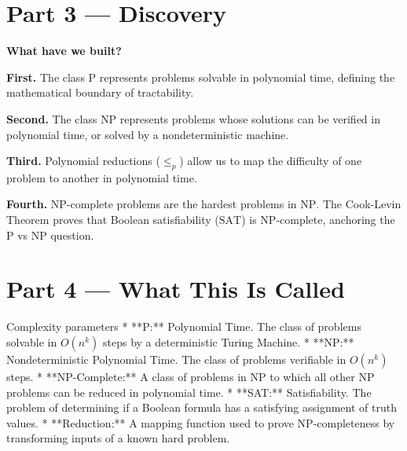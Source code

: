 \documentclass[12pt, a4paper]{book}
\begin{document}
\newpage

\section{Part 3 --- Discovery}

\begin{discoverybox}
\textbf{What have we built?}

\textbf{First.} The class $\text{P}$ represents problems solvable in polynomial time, defining the mathematical boundary of tractability.

\textbf{Second.} The class $\text{NP}$ represents problems whose solutions can be verified in polynomial time, or solved by a nondeterministic machine.

\textbf{Third.} Polynomial reductions ($\le_p$) allow us to map the difficulty of one problem to another in polynomial time.

\textbf{Fourth.} NP-complete problems are the hardest problems in $\text{NP}$. The Cook-Levin Theorem proves that Boolean satisfiability ($\text{SAT}$) is NP-complete, anchoring the P vs NP question.
\end{discoverybox}

\newpage

\section{Part 4 --- What This Is Called}

\begin{namedconcept}{Complexity parameters}
* **$\text{P}$:** Polynomial Time. The class of problems solvable in $O(n^k)$ steps by a deterministic Turing Machine.
* **$\text{NP}$:** Nondeterministic Polynomial Time. The class of problems verifiable in $O(n^k)$ steps.
* **NP-Complete:** A class of problems in $\text{NP}$ to which all other $\text{NP}$ problems can be reduced in polynomial time.
* **SAT:** Satisfiability. The problem of determining if a Boolean formula has a satisfying assignment of truth values.
* **Reduction:** A mapping function used to prove NP-completeness by transforming inputs of a known hard problem.
\end{namedconcept}

\newpage

\end{document}
